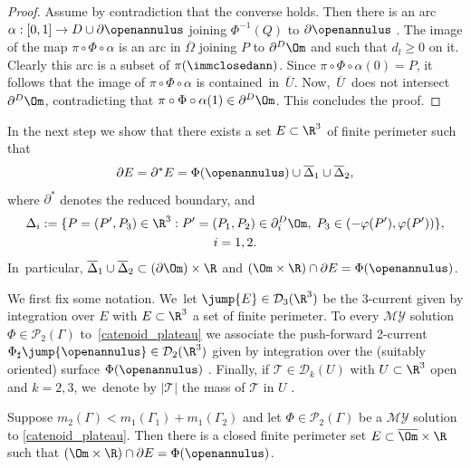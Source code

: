\begin{proof}
Assume by contradiction that the converse holds. Then there is an arc $\alpha:[0,1]\to D\cup\partial\openannulus$ joining $\Phi^{-1}(Q)$ to $\partial\openannulus$ .
The image of the
map $\pi\circ\Phi\circ \alpha$ is an arc in $\overline \Omega$
joining $P$ to $\partial^D\Om$ and such that $d_l\geq0$ on it.
Clearly this arc is a subset of $\pi(\immclosedann)$. Since $\pi\circ\Phi\circ \alpha(0)=P$, it follows that the image of $\pi\circ\Phi\circ \alpha$ is contained~in~$\overline U$. Now,~$\overline U$~does not intersect $\partial^D\Om$, contradicting that $\pi\circ\Phi\circ \alpha(1)\in \partial^D\Om$. This concludes the proof.
\end{proof}

In the next step we show
that there exists a set $E\subset\R^3$ of finite perimeter such that
\[
\partial E=\partial^*E=\Phi(\openannulus)\cup\overline\Delta_1\cup\overline\Delta_2,
\]
where $\partial^*$ denotes the reduced boundary, and
\begin{multline}\label{delta}
\Delta_i:=\{P=(P',P_3)\in \R^3:P'=(P_1,P_2)\in \partial_i^D\Om, \;P_3\in (-\varphi(P'),\varphi(P'))\},
\\
i=1,2.
\end{multline}
In~particular, $\overline\Delta_1\cup\overline\Delta_2\subset(\partial\Om)\times\R$ and
$(\Om\times\R)\cap\partial E=\Phi(\openannulus)$.

We first fix some notation. We~let $\jump{E}\in\mathcal{D}_3(\R^3)$ be the 3-current given by integration over $E$ with $E\subset\R^3$ a set of finite perimeter.
To every $\mathcal{MY}$ solution
$\Phi\in\mathcal{P}_2(\Gamma)$
to~\eqref{catenoid_plateau} we associate the push-forward 2-current $\Phi_\sharp\jump{\openannulus}\in\mathcal D_2(\R^3)$ given by integration over the (suitably oriented) surface $\Phi(\openannulus)$
\cite[\S 7.4.2]{Krantz-Parks}.
Finally, if $\mathcal{T}\in\mathcal{D}_k(U)$ with $U\subset\R^3$ open and $k=2,3$, we~denote by $|\mathcal{T}|$ the mass of $\mathcal{T}$ in $U$
\cite[p.\,358]{Federer}.

\begin{lemma}
\label{lem:region_enclosed_by_Phi(Sigma_min)}
Suppose $m_2(\Gamma)<m_1(\Gamma_1)+m_1(\Gamma_2)$ and let $\Phi\in\mathcal{P}_2(\Gamma)$ be a $\mathcal{MY}$ solution to \eqref{catenoid_plateau}.
Then there is a closed
finite perimeter set $E\subset\overline\Om\times\R$ such that $(\Om\times\R)\cap\partial E=\Phi(\openannulus)$.
\end{lemma}

